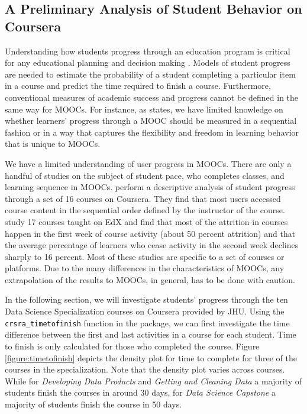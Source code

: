 \subsection{A Preliminary Analysis of Student Behavior on
Coursera}\label{a-preliminary-analysis-of-student-behavior-on-coursera}

Understanding how students progress through an education program is
critical for any educational planning and decision making
\citep{king1972primary}. Models of student progress are needed to
estimate the probability of a student completing a particular item in a
course and predict the time required to finish a course. Furthermore,
conventional measures of academic success and progress cannot be defined
in the same way for MOOCs. For instance, as \cite{perna2014moving}
states, we have limited knowledge on whether learners' progress through
a MOOC should be measured in a sequential fashion or in a way that
captures the flexibility and freedom in learning behavior that is unique
to MOOCs.

We have a limited understanding of user progress in MOOCs. There are
only a handful of studies on the subject of student pace, who completes
classes, and learning sequence in MOOCs. \cite{perna2014moving} perform
a descriptive analysis of student progress through a set of 16 courses
on Coursera. They find that most users accessed course content in the
sequential order defined by the instructor of the course.
\cite{ho2014harvardx} study 17 courses taught on EdX and find that most
of the attrition in courses happen in the first week of course activity
(about 50 percent attrition) and that the average percentage of learners
who cease activity in the second week declines sharply to 16 percent.
Most of these studies are specific to a set of courses or platforms. Due
to the many differences in the characteristics of MOOCs, any
extrapolation of the results to MOOCs, in general, has to be done with
caution.

In the following section, we will investigate students' progress through
the ten Data Science Specialization courses on Coursera provided by JHU.
Using the \texttt{crsra\_timetofinish} function in the 
package, we can first investigate the time difference between the first
and last activities in a course for each student. Time to finish is only
calculated for those who completed the course. Figure
\ref{figure:timetofinish} depicts the density plot for time to complete
for three of the courses in the specialization. Note that the density
plot varies across courses. While for \emph{Developing Data Products}
and \emph{Getting and Cleaning Data} a majority of students finish the
courses in around 30 days, for \emph{Data Science Capstone} a majority
of students finish the course in 50 days.

